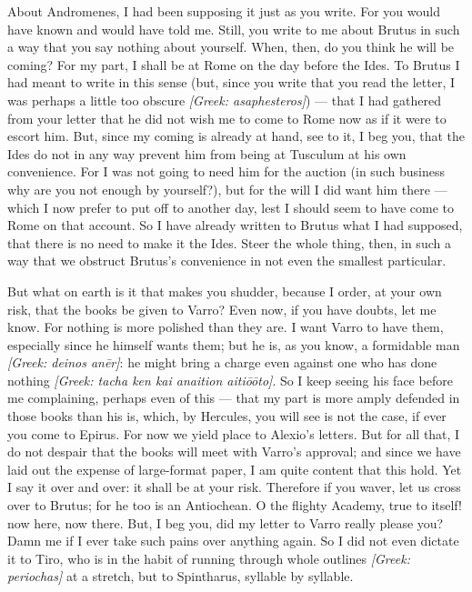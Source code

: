

 About Andromenes, I had been supposing it just as you write. For you would have known and would have told me. Still, you write to me about Brutus in such a way that you say nothing about yourself. When, then, do you think he will be coming? For my part, I shall be at Rome on the day before the Ides. To Brutus I had meant to write in this sense (but, since you write that you read the letter, I was perhaps a little too obscure \textit{[Greek: asaphesteros]}) --- that I had gathered from your letter that he did not wish me to come to Rome now as if it were to escort him. But, since my coming is already at hand, see to it, I beg you, that the Ides do not in any way prevent him from being at Tusculum at his own convenience. For I was not going to need him for the auction (in such business why are you not enough by yourself?), but for the will I did want him there --- which I now prefer to put off to another day, lest I should seem to have come to Rome on that account. So I have already written to Brutus what I had supposed, that there is no need to make it the Ides. Steer the whole thing, then, in such a way that we obstruct Brutus's convenience in not even the smallest particular.

 But what on earth is it that makes you shudder, because I order, at your own risk, that the books be given to Varro? Even now, if you have doubts, let me know. For nothing is more polished than they are. I want Varro to have them, especially since he himself wants them; but he is, as you know, a formidable man \textit{[Greek: deinos anēr]}: he might bring a charge even against one who has done nothing \textit{[Greek: tacha ken kai anaition aitiōōto]}. So I keep seeing his face before me complaining, perhaps even of this --- that my part is more amply defended in those books than his is, which, by Hercules, you will see is not the case, if ever you come to Epirus. For now we yield place to Alexio's letters. But for all that, I do not despair that the books will meet with Varro's approval; and since we have laid out the expense of large-format paper, I am quite content that this hold. Yet I say it over and over: it shall be at your risk. Therefore if you waver, let us cross over to Brutus; for he too is an Antiochean. O the flighty Academy, true to itself! now here, now there. But, I beg you, did my letter to Varro really please you? Damn me if I ever take such pains over anything again. So I did not even dictate it to Tiro, who is in the habit of running through whole outlines \textit{[Greek: periochas]} at a stretch, but to Spintharus, syllable by syllable.
